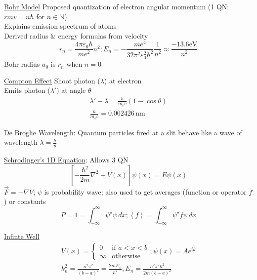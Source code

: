 \documentclass[8pt]{minimal}
\begin{document}
    \underline{Bohr Model} Proposed quantization of electron angular momentum (1 QN: $rmv = n\hbar$ for $n \in \mathbb{N}$)\\
        Explains emission spectrum of atoms\\
        Derived radius \& energy formulas from velocity
        \begin{equation*}
            r_n = \frac{4\pi\varepsilon_0\hbar}{me^2}n^2;
            E_n = -\frac{me^4}{32\pi^2\varepsilon_0^2\hbar^2}\frac{1}{n^2} \approx \frac{-13.6\unit{\eV}}{n^2}
        \end{equation*}
        Bohr radius $a_0$ is $r_n$ when $n = 0$

    \underline{Compton Effect} Shoot photon ($\lambda$) at electron\\ Emits photon ($\lambda'$) at angle $\theta$
    \begin{gather*}
        \lambda' - \lambda = \frac{h}{m_e c} (1 - \cos\theta)\\
        \frac{h}{m_e c} = 0.002426\,\unit{\nano\meter}
    \end{gather*}

    De Broglie Wavelength: Quantum particles fired at a slit behave like a wave of wavelength $\lambda = \frac{h}{p}$

    \underline{Schrodinger's 1D Equation}: Allows 3 QN
    \begin{equation*}
        \left[ -\frac{\hbar^2}{2m}\nabla^2 + V(x) \right]\psi(x) = E\psi(x)
    \end{equation*}
    $\vec{F} = -\nabla V$; $\psi$ is probability wave; also used to get averages (function or operator $f$) or constants\\
    \begin{equation*}
        P = 1 = \int_{-\infty}^{\infty} \psi^\star \psi\,dx; \left\langle f \right\rangle = \int_{-\infty}^{\infty} \psi^\star f \psi\,dx
    \end{equation*}

    \underline{Infinte Well}
    \begin{gather*}
        V(x) = \begin{cases}
            0 & \text{if } a < x < b \\
            \infty & \text{otherwise}
        \end{cases}; \psi(x) = Ae^{ik}\\
        k_n^2 = \frac{n^2\pi^2}{(b - a)^2} = \frac{2mE_n}{\hbar^2};
        E_n = \frac{n^2\pi^2\hbar^2}{2m(b - a)^2}
    \end{gather*}
\end{document}

